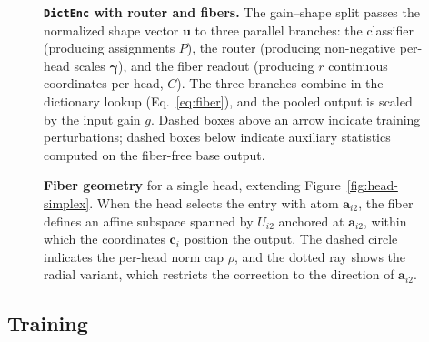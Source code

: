 \begin{figure}[tp]
\centering
\resizebox{\linewidth}{!}{}
\caption[\texttt{DictEnc} with router and fibers]{\textbf{\texttt{DictEnc}
	with router and fibers.} The gain--shape split passes the normalized
	shape vector $\mathbf{u}$ to three parallel branches: the classifier
	(producing assignments $P$), the router (producing non-negative per-head
	scales $\boldsymbol{\gamma}$), and the fiber readout (producing $r$
	continuous coordinates per head, $C$). The three branches combine in the
	dictionary lookup (Eq.~\eqref{eq:fiber}), and the pooled output is scaled
	by the input gain $g$. Dashed boxes above an arrow indicate training
	perturbations; dashed boxes below indicate auxiliary statistics computed
	on the fiber-free base output.}
\label{fig:dictenc-full}
\end{figure}

\begin{figure}[tp]
\centering

\caption[Fiber geometry]{\textbf{Fiber geometry} for a single head, extending
	Figure~\ref{fig:head-simplex}. When the head selects the entry with atom
	$\mathbf{a}_{i2}$, the fiber defines an affine subspace spanned by
	$U_{i2}$ anchored at $\mathbf{a}_{i2}$, within which the coordinates
	$\mathbf{c}_i$ position the output. The dashed circle indicates the
	per-head norm cap $\rho$, and the dotted ray shows the radial variant,
	which restricts the correction to the direction of $\mathbf{a}_{i2}$.}
\label{fig:fiber}
\end{figure}

\subsection{Training}
\label{sec:training}


